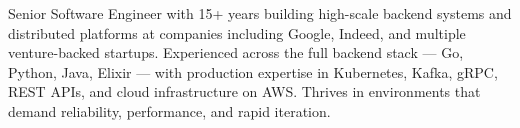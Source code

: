 

\begin{cvparagraph}

Senior Software Engineer with 15+ years building high-scale backend systems and distributed platforms at companies including Google, Indeed, and multiple venture-backed startups. Experienced across the full backend stack — Go, Python, Java, Elixir — with production expertise in Kubernetes, Kafka, gRPC, REST APIs, and cloud infrastructure on AWS. Thrives in environments that demand reliability, performance, and rapid iteration.
\end{cvparagraph}
